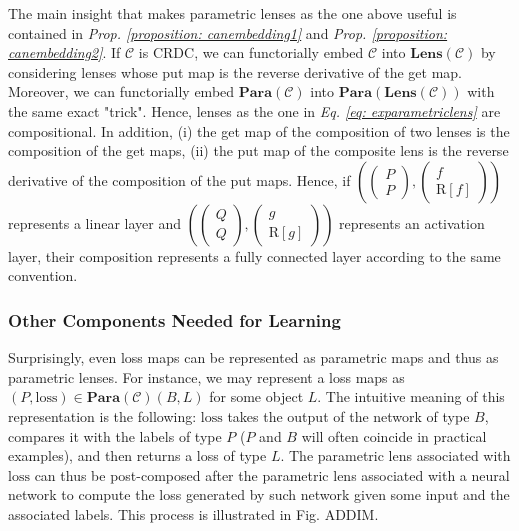 \documentclass[11pt,a4paper,openright,twoside]{report}
\theoremstyle{plain}
\theoremstyle{definition}
\begin{document}
The main insight that makes parametric lenses as the one above useful is contained in \textit{Prop. \ref{proposition: canembedding1}} and \textit{Prop. \ref{proposition: canembedding2}}. If $\mathcal{C}$ is CRDC, we can functorially embed $\mathcal{C}$ into $\mathbf{Lens}(\mathcal{C})$ by considering lenses whose put map is the reverse derivative of the get map. Moreover, we can functorially embed $\mathbf{Para}(\mathcal{C})$ into $\mathbf{Para}(\mathbf{Lens}(\mathcal{C}))$ with the same exact "trick". Hence, lenses as the one in \textit{Eq. \ref{eq: exparametriclens}} are compositional. In addition, (i) the get map of the composition of two lenses is the composition of the get maps, (ii) the put map of the composite lens is the reverse derivative of the composition of the put maps. Hence, if $\left(\left(\begin{smallmatrix} P \\ P \end{smallmatrix}\right),\left(\begin{smallmatrix} f \\ \mathrm{R}[f] \end{smallmatrix}\right)\right)$ represents a linear layer and $\left(\left(\begin{smallmatrix} Q \\ Q \end{smallmatrix}\right),\left(\begin{smallmatrix} g \\ \mathrm{R}[g] \end{smallmatrix}\right)\right)$ represents an activation layer, their composition represents a fully connected layer according to the same convention.


\subsubsection{Other Components Needed for Learning}


Surprisingly, even loss maps can be represented as parametric maps and thus as parametric lenses.
For instance, we may represent a loss maps as $(P,\mathrm{loss}) \in \mathbf{Para}(\mathcal{C})(B,L)$ for some object $L$. The intuitive meaning of this representation is the following: $\mathrm{loss}$ takes the output of the network of type $B$, compares it with the labels of type $P$ ($P$ and $B$ will often coincide in practical examples), and then returns a loss of type $L$. The parametric lens associated with $\mathrm{loss}$ can thus be post-composed after the parametric lens associated with a neural network to compute the loss generated by such network given some input and the associated labels. This process is illustrated in Fig. ADDIM.
\end{document}
